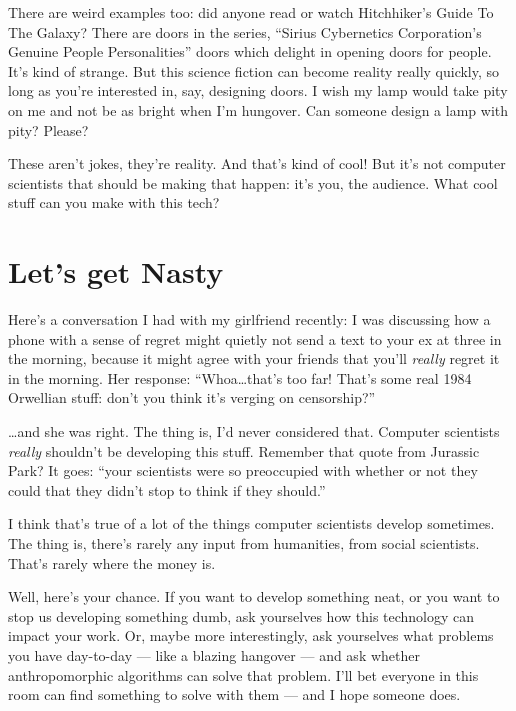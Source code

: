\documentclass[draft]{tufte-handout}
\begin{document}
There are weird examples too: did anyone read or watch Hitchhiker's Guide To The Galaxy? There are doors in the series, ``Sirius Cybernetics Corporation's Genuine People Personalities'' doors which delight in opening doors for people. It's kind of strange. But this science fiction can become reality really quickly, so long as you're interested in, say, designing doors. I wish my lamp would take pity on me and not be as bright when I'm hungover. Can someone design a lamp with pity? Please?\par

These aren't jokes, they're reality. And that's kind of cool! But it's not computer scientists that should be making that happen: it's you, the audience. What cool stuff can you make with this tech?

\section{Let's get Nasty}
Here's a conversation I had with my girlfriend recently: I was discussing how a phone with a sense of regret might quietly not send a text to your ex at three in the morning, because it might agree with your friends that you'll \emph{really} regret it in the morning. Her response: ``Whoa\ldots{}that's too far! That's some real 1984 Orwellian stuff: don't you think it's verging on censorship?''\par

\ldots{}and she was right. The thing is, I'd never considered that. Computer scientists \emph{really} shouldn't be developing this stuff. Remember that quote from Jurassic Park? It goes: ``your scientists were so preoccupied with whether or not they could that they didn't stop to think if they should.''\par

I think that's true of a lot of the things computer scientists develop sometimes. The thing is, there's rarely any input from humanities, from social scientists. That's rarely where the money is.\par

Well, here's your chance. If you want to develop something neat, or you want to stop us developing something dumb, ask yourselves how this technology can impact your work. Or, maybe more interestingly, ask yourselves what problems you have day-to-day --- like a blazing hangover --- and ask whether anthropomorphic algorithms can solve that problem. I'll bet everyone in this room can find something to solve with them --- and I hope someone does. 
\end{document}
